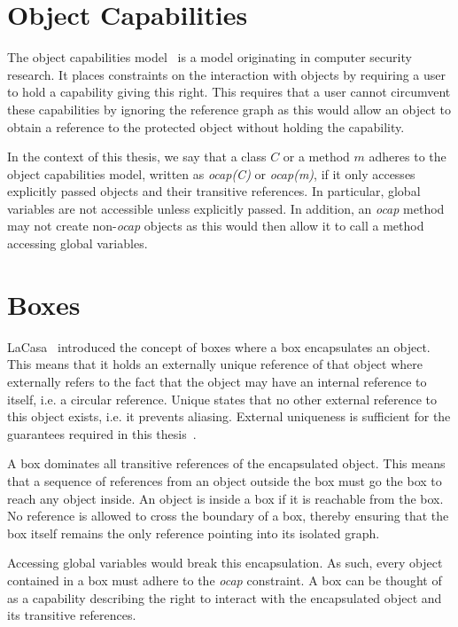\section{Object Capabilities}
The object capabilities model~\cite{miller_robust_2006} is a model originating in computer security research. It places constraints on the interaction with objects by requiring a user to hold a capability giving this right. This requires that a user cannot circumvent these capabilities by ignoring the reference graph as this would allow an object to obtain a reference to the protected object without holding the capability.

In the context of this thesis, we say that a class $C$ or a method $m$ adheres to the object capabilities model, written as \textit{ocap(C)} or \textit{ocap(m)}, if it only accesses explicitly passed objects and their transitive references. In particular, global variables are not accessible unless explicitly passed. In addition, an \textit{ocap} method may not create non-\textit{ocap} objects as this would then allow it to call a method accessing global variables.

\section{Boxes}
LaCasa~\cite{haller_lacasa_2016} introduced the concept of boxes where a box encapsulates an object. This means that it holds an externally unique reference of that object where externally refers to the fact that the object may have an internal reference to itself, i.e. a circular reference. Unique states that no other external reference to this object exists, i.e. it prevents aliasing. External uniqueness is sufficient for the guarantees required in this thesis~\cite{clarke_external_2003}.

A box dominates all transitive references of the encapsulated object. This means that a sequence of references from an object outside the box must go  the box to reach any object inside. An object is inside a box if it is reachable from the box. No reference is allowed to cross the boundary of a box, thereby ensuring that the box itself remains the only reference pointing into its isolated graph.

Accessing global variables would break this encapsulation. As such, every object contained in a box must adhere to the \textit{ocap} constraint. A box can be thought of as a capability describing the right to interact with the encapsulated object and its transitive references.

